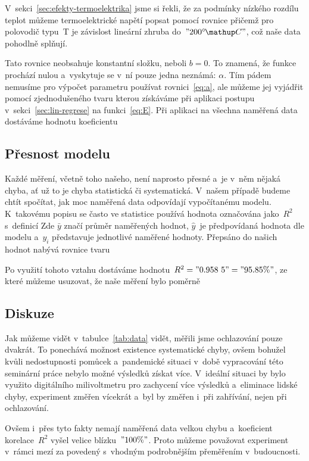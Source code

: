 V~sekci~\ref{sec:efekty-termoelektrika} jsme si řekli, že za podmínky nízkého
rozdílu teplot můžeme termoelektrické napětí popsat pomocí rovnice
přičemž pro polovodič typu~T je závislost lineární zhruba  do~$"200 \C"$, což
naše data pohodlně splňují.~\cite{thermocoupleinfo}

Tato rovnice neobsahuje konstantní složku, neboli $b=0$. To znamená, že funkce
prochází nulou a~vyskytuje se v~ní pouze jedna neznámá: $\alpha$. Tím pádem
nemusíme pro výpočet parametru používat rovnici~\eqref{eq:a}, ale můžeme jej
vyjádřit pomocí zjednodušeného tvaru
kterou získáváme při aplikaci postupu v~sekci~\ref{sec:lin-regrese} na 
funkci~\eqref{eq:E}. Při aplikaci na všechna naměřená data dostáváme hodnotu
koeficientu

\subsection{Přesnost modelu}
Každé měření, včetně toho našeho, není naprosto přesné a~je v~něm nějaká chyba,
ať už to je chyba statistická či systematická. V~našem případě budeme chtít 
spočítat, jak moc naměřená data odpovídají vypočítanému modelu. K~takovému
popisu se často ve statistice používá hodnota označována  jako~$R^2$ s~definicí
Zde $\bar y$ značí průměr naměřených hodnot, $\hat y$~je  předpovídaná hodnota
dle modelu a~$y_i$ představuje jednotlivé naměřené hodnoty. Přepsáno do našich
hodnot nabývá rovnice tvaru

Po využití tohoto vztahu dostáváme hodnotu~$R^2 = "0.958~5" = "95.85 \%"$, ze
které můžeme usuzovat, že naše měření bylo poměrně

\subsection{Diskuze}
Jak můžeme vidět v~tabulce~\ref{tab:data} vidět, měřili jsme ochlazování pouze
dvakrát. To ponechává možnost existence systematické chyby, ovšem bohužel kvůli
nedostupnosti pomůcek a~pandemické situaci v~době vypracování této seminární
práce nebylo možné výsledků získat více. V~ideální situaci by bylo využito
digitálního milivoltmetru pro zachycení více výsledků a~eliminace lidské chyby,
experiment změřen vícekrát a~byl by změřen i~při zahřívání, nejen při
ochlazování.

Ovšem i~přes tyto fakty nemají naměřená data velkou chybu a~koeficient
korelace~$R^2$ vyšel velice blízku~$"100 \%"$. Proto můžeme považovat
experiment v~rámci mezí za povedený s~vhodným podrobnějším přeměřením
v~budoucnosti.
